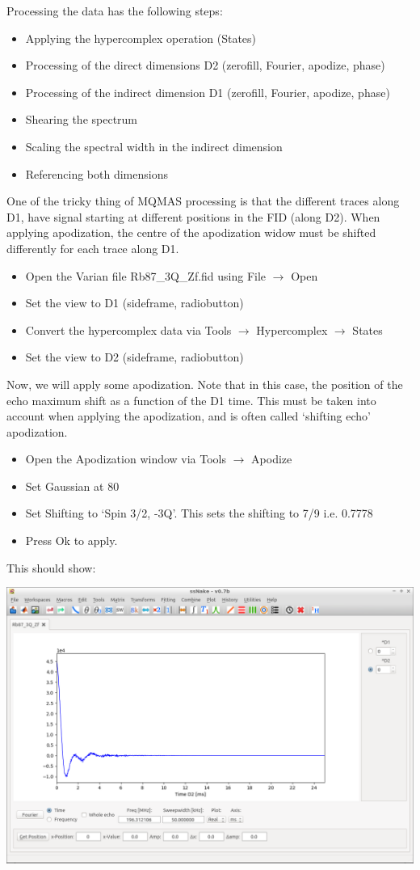 \documentclass[11pt,a4paper]{article}
\begin{document}
Processing the data has the following steps:
\begin{itemize}
  \item Applying the hypercomplex operation (States)
  \item Processing of the direct dimensions D2 (zerofill, Fourier, apodize, phase)
  \item Processing of the indirect dimension D1 (zerofill, Fourier, apodize, phase)
  \item Shearing the spectrum
  \item Scaling the spectral width in the indirect dimension
  \item Referencing both dimensions
\end{itemize}

One of the tricky thing of MQMAS processing is that the different traces along D1, have signal
starting at different positions in the FID (along D2). When applying apodization, the centre of the
apodization widow must be shifted differently for each trace along D1.


\begin{itemize}
	\item Open the Varian file Rb87\_3Q\_Zf.fid using File $\longrightarrow$ Open
	\item Set the view to D1 (sideframe, radiobutton)
	\item Convert the hypercomplex data via Tools  $\longrightarrow$ Hypercomplex  $\longrightarrow$
	  States
	\item Set the view to D2 (sideframe, radiobutton)
\end{itemize}
Now, we will apply some apodization. Note that in this case, the position of the echo maximum shift
as a function of the D1 time. This must be taken into account when applying the apodization, and is
often called `shifting echo' apodization.

\begin{itemize}
	\item Open the Apodization window via Tools $\longrightarrow$ Apodize
 \item Set Gaussian at 80
 \item Set Shifting to `Spin 3/2, -3Q'. This sets the shifting to 7/9 i.e. 0.7778
 \item Press Ok to apply.
\end{itemize}
This should show:
\begin{center}
\includegraphics[width=0.8\linewidth]{Figs/Fig1.png}
\end{center}
\end{document}

